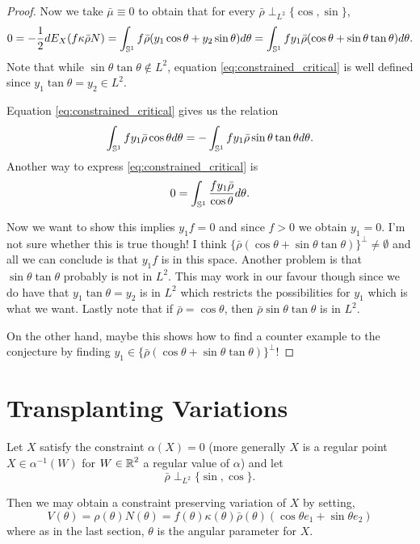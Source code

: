 \documentclass[12pt]{article}
\begin{document}
\begin{proof}
Now we take \(\bar{\mu} \equiv 0\) to obtain that for every \(\bar{\rho} \perp_{L^2} \{\cos,\sin\}\),
\begin{equation}
\label{eq:constrained_critical}
0 = -\frac{1}{2} dE_X(f\kappa\bar{\rho} N) = \int_{\operatorname{\mathbb{S}^1}} f\bar{\rho}(y_1 \cos\theta + y_2 \sin\theta) d\theta = \int_{\operatorname{\mathbb{S}^1}} f y_1 \bar{\rho}(\cos\theta + \sin\theta\tan\theta) d\theta.
\end{equation}
Note that while \(\sin\theta\tan\theta \notin L^2\), equation \eqref{eq:constrained_critical} is well defined since \(y_1 \tan\theta = y_2 \in L^2\).

Equation \eqref{eq:constrained_critical} gives us the relation
\[
\int_{\operatorname{\mathbb{S}^1}} f y_1 \bar{\rho} \cos\theta d\theta = - \int_{\operatorname{\mathbb{S}^1}} f y_1 \bar{\rho} \sin\theta\tan\theta d\theta.
\]
Another way to express \eqref{eq:constrained_critical} is
\[
0 = \int_{\operatorname{\mathbb{S}^1}} \frac{f y_1 \bar{\rho}}{\cos\theta} d\theta.
\]


{\color{red} Now we want to show this implies $y_1f = 0$ and since \(f > 0\) we obtain \(y_1 = 0\). I'm not sure whether this is true though! I think \(\{\bar{\rho}(\cos\theta + \sin\theta\tan\theta)\}^{\perp} \ne \emptyset\) and all we can conclude is that \(y_1 f\) is in this space. Another problem is that \(\sin\theta\tan\theta\) probably is not in \(L^2\). This may work in our favour though since we do have that \(y_1 \tan\theta = y_2\) is in \(L^2\) which restricts the possibilities for \(y_1\) which is what we want. Lastly note that if \(\bar{\rho} = \cos\theta\), then \(\bar{\rho} \sin\theta\tan\theta\) is in \(L^2\).

On the other hand, maybe this shows how to find a counter example to the conjecture by finding \(y_1 \in \{\bar{\rho}(\cos\theta + \sin\theta\tan\theta)\}^{\perp}\)!}
\end{proof}

\section{Transplanting Variations}

Let \(X\) satisfy the constraint \(\alpha(X) = 0\) (more generally \(X\) is a regular point \(X \in \alpha^{-1} (W)\) for \(W \in \operatorname{\mathbb{R}}^2\) a regular value of \(\alpha\)) and let
\[
\bar{\rho} \perp_{L^2} \{\sin, \cos\}.
\]

Then we may obtain a constraint preserving variation of \(X\) by setting,
\[
V(\theta) = \rho(\theta) N(\theta) = f(\theta) \kappa(\theta) \bar{\rho}(\theta) (\cos\theta e_1 + \sin\theta e_2)
\]
where as in the last section, \(\theta\) is the angular parameter for \(X\).
\end{document}

